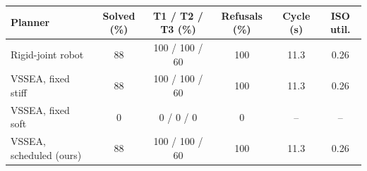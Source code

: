 \begin{tabular}{lccccc}
\toprule
Planner & Solved (\%) & T1 / T2 / T3 (\%) & Refusals (\%) & Cycle (s) & ISO util. \\
\midrule
Rigid-joint robot & 88 & 100 / 100 / 60 & 100 & 11.3 & 0.26 \\
VSSEA, fixed stiff & 88 & 100 / 100 / 60 & 100 & 11.3 & 0.26 \\
VSSEA, fixed soft & 0 & 0 / 0 / 0 & 0 & -- & -- \\
VSSEA, scheduled (ours) & 88 & 100 / 100 / 60 & 100 & 11.3 & 0.26 \\
\bottomrule
\end{tabular}